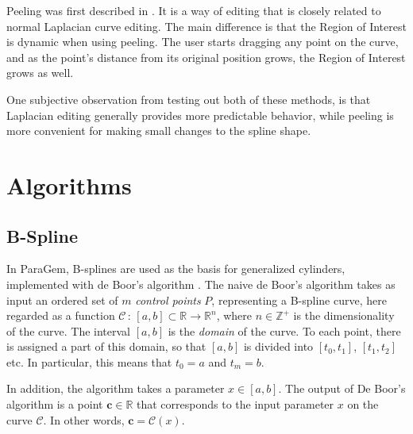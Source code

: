 \documentclass[english]{article}
\begin{document}
Peeling was first described in \cite{rigid_igarashi}. It is a way of editing that is closely related to normal Laplacian curve editing. The main difference is that the Region of Interest is dynamic when using peeling. The user starts dragging any point on the curve, and as the point's distance from its original position grows, the Region of Interest grows as well.

One subjective observation from testing out both of these methods, is that Laplacian editing generally provides more predictable behavior, while peeling is more convenient for making small changes to the spline shape.



\pagebreak

\section{Algorithms} \label{section_algorithms}

\subsection{B-Spline} \label{section_b_spline}


In ParaGem, B-splines are used as the basis for generalized cylinders, implemented with de Boor's algorithm \cite{deboor}. The naive de Boor's algorithm takes as input an ordered set of $m$ \textit{control points} $P$, representing a B-spline curve, here regarded as a function $\mathcal{C} \, : \, [a, b] \subset \mathbb{R} \rightarrow \mathbb{R}^n$, where $n \in \mathbb{Z^+}$ is the dimensionality of the curve. The interval $[a, b]$ is the \textit{domain} of the curve. To each point, there is assigned a part of this domain, so that $[a, b]$ is divided into $[t_0, t_1]$, $[t_1, t_2]$ etc. In particular, this means that $t_0 = a$ and $t_m = b$.

In addition, the algorithm takes a parameter $x \in [a, b]$. The output of De Boor's algorithm is a point $\mathbf{c} \in \mathbb{R}$ that corresponds to the input parameter $x$ on the curve $\mathcal{C}$. In other words, $\mathbf{c} = \mathcal{C}(x)$.
\end{document}
